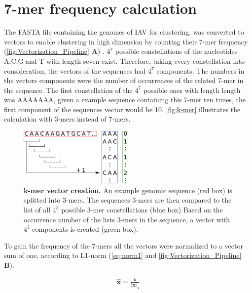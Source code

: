 \section{7-mer frequency calculation} \label{sec:Frequency}

The FASTA file containing the genomes of \gls{IAV} for clustering, was converted to vectors to enable clustering in high dimension by counting their 7-mer frequency (\autoref{fig:Vectorization_Pipeline} \textsf{\textbf{A}}) \autocite{edgar_muscle_2004}. $4^7$ possible constellations of the nucleotides A,C,G and T with length seven exist. Therefore, taking every constellation into consideration, the vectors of the sequences had $4^7$ components. The numbers in the vectors components were the number of occurrences of the related 7-mer in the sequence. The first constellation of the $4^7$ possible ones with length length was AAAAAAA, given a example sequence containing this 7-mer ten times, the first component of the sequences vector would be 10. \autoref{fig:k-mer} illustrates the calculation with 3-mers instead of 7-mers.

\begin{figure}[!hbt]
    \centering
    \includegraphics[width=0.5\textwidth]{Graphics/Kmer.pdf}
    \caption[$k$-mer vector creation]{\textbf{$\bm{k}$-mer vector creation.} An example genomic sequence (red box) is splitted into 3-mers. The sequences 3-mers are then compared to the list of all $4^3$ possible 3-mer constellations (blue box) Based on the occurrence number of the lists 3-mers in the sequence, a vector with $4^3$ components is created (green box).}
    \label{fig:k-mer}
\end{figure}

To gain the frequency of the 7-mers all the vectors were normalized to a vector sum of one, according to L1-norm (\autoref{eq:norm1} and \autoref{fig:Vectorization_Pipeline} \textsf{\textbf{B}}). 

\begin{equation}\label{eq:norm1}
    \begin{aligned}
        \mathbf{\hat{x}} = \frac{\mathbf{x}}{\Vert\mathbf{x}\Vert_1}
    \end{aligned}
\end{equation}

